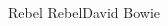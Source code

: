 \documentclass[a4paper,11pt,french]{article}
\begin{document}
\begin{Song}{Rebel Rebel}{David Bowie}
\begin{multicols}{2}

\gridGroupNormal

\begin{Chords}
\hline
\\\hline
\end{Chords}
\espaceInterGrille


\begin{Chords}
\hline
\\\hline
\end{Chords}

\end{multicols}

\vfill

\end{Song}

\end{document}
